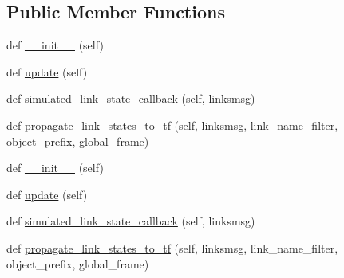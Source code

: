 \subsection*{Public Member Functions}
\begin{DoxyCompactItemize}
\item 
def \hyperlink{classfake__cube__perception__node_1_1FakePerceptionNode_a6f5d90816c2222cf76bd632b5ad46457}{\+\_\+\+\_\+init\+\_\+\+\_\+} (self)
\item 
def \hyperlink{classfake__cube__perception__node_1_1FakePerceptionNode_ae73741e7f84f057cbf109698e70a2515}{update} (self)
\item 
def \hyperlink{classfake__cube__perception__node_1_1FakePerceptionNode_ac1127eae8d2eda994b22873529bd198f}{simulated\+\_\+link\+\_\+state\+\_\+callback} (self, linksmsg)
\item 
def \hyperlink{classfake__cube__perception__node_1_1FakePerceptionNode_aeac788f768e625ecbe445c6af105d3f8}{propagate\+\_\+link\+\_\+states\+\_\+to\+\_\+tf} (self, linksmsg, link\+\_\+name\+\_\+filter, object\+\_\+prefix, global\+\_\+frame)
\item 
def \hyperlink{classfake__cube__perception__node_1_1FakePerceptionNode_a6f5d90816c2222cf76bd632b5ad46457}{\+\_\+\+\_\+init\+\_\+\+\_\+} (self)
\item 
def \hyperlink{classfake__cube__perception__node_1_1FakePerceptionNode_ae73741e7f84f057cbf109698e70a2515}{update} (self)
\item 
def \hyperlink{classfake__cube__perception__node_1_1FakePerceptionNode_ac1127eae8d2eda994b22873529bd198f}{simulated\+\_\+link\+\_\+state\+\_\+callback} (self, linksmsg)
\item 
def \hyperlink{classfake__cube__perception__node_1_1FakePerceptionNode_aeac788f768e625ecbe445c6af105d3f8}{propagate\+\_\+link\+\_\+states\+\_\+to\+\_\+tf} (self, linksmsg, link\+\_\+name\+\_\+filter, object\+\_\+prefix, global\+\_\+frame)
\end{DoxyCompactItemize}
